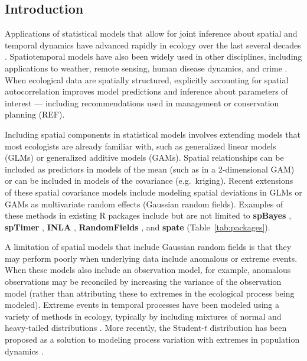 \documentclass[12pt,english]{article}
\begin{document}
\begin{spacing}{1.3}
\section{Introduction}

Applications of statistical models that allow for joint inference about spatial
and temporal dynamics have advanced rapidly in ecology over the last several
decades \citep[e.g.][]{bascompte1995, latimer2009}. Spatiotemporal models have
also been widely used in other disciplines, including applications to weather,
remote sensing, human disease dynamics, and crime \citep{cressie2011}. When
ecological data are spatially structured, explicitly accounting for spatial
autocorrelation improves model predictions and inference about parameters of
interest --- including recommendations used in management or conservation
planning (REF).

Including spatial components in statistical models involves extending models
that most ecologists are already familiar with, such as generalized linear
models (GLMs) or generalized additive models (GAMs). Spatial relationships can
be included as predictors in models of the mean (such as in a 2-dimensional
GAM) or can be included in models of the covariance (e.g.\ kriging). Recent
extensions of these spatial covariance models include modeling spatial
deviations in GLMs or GAMs as multivariate random effects (Gaussian random
fields). Examples of these methods in existing R packages include but are not
limited to \textbf{spBayes} \citep{finley2007}, \textbf{spTimer}
\citep{bakar2015}, \textbf{INLA} \citep{rue2009}, \textbf{RandomFields}
\citep{schlather2016}, and \textbf{spate} \citep{sigrist2015}
(Table~\ref{tab:packages}).

A limitation of spatial models that include Gaussian random fields is that they
may perform poorly when underlying data include anomalous or extreme events.
When these models also include an observation model, for example, anomalous
observations may be reconciled by increasing the variance of the observation
model (rather than attributing these to extremes in the ecological process
being modeled). Extreme events in temporal processes have been modeled using a
variety of methods in ecology, typically by including mixtures of normal and
heavy-tailed distributions \citep[e.g.][]{everitt1996, ward2007, thorson2011}.
More recently, the Student-$t$ distribution has been proposed as a
solution to modeling process variation with extremes in population dynamics
\citep{anderson2017}.


\end{spacing}
\end{document}
